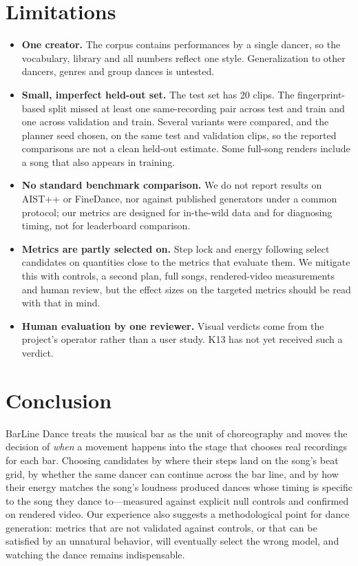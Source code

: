 \documentclass[10pt]{article}
\begin{document}
\section{Limitations}
\label{sec:limitations}

\begin{itemize}
  \item \textbf{One creator.} The corpus contains performances by a single dancer, so the vocabulary, library and all numbers reflect one style. Generalization to other dancers, genres and group dances is untested.
  \item \textbf{Small, imperfect held-out set.} The test set has 20 clips. The fingerprint-based split missed at least one same-recording pair across test and train and one across validation and train. Several variants were compared, and the planner seed chosen, on the same test and validation clips, so the reported comparisons are not a clean held-out estimate. Some full-song renders include a song that also appears in training.
  \item \textbf{No standard benchmark comparison.} We do not report results on AIST++ or FineDance, nor against published generators under a common protocol; our metrics are designed for in-the-wild data and for diagnosing timing, not for leaderboard comparison.
  \item \textbf{Metrics are partly selected on.} Step lock and energy following select candidates on quantities close to the metrics that evaluate them. We mitigate this with controls, a second plan, full songs, rendered-video measurements and human review, but the effect sizes on the targeted metrics should be read with that in mind.
  \item \textbf{Human evaluation by one reviewer.} Visual verdicts come from the project's operator rather than a user study. K13 has not yet received such a verdict.
\end{itemize}

\section{Conclusion}

BarLine Dance treats the musical bar as the unit of choreography and moves the decision of \emph{when} a movement happens into the stage that chooses real recordings for each bar.
Choosing candidates by where their steps land on the song's beat grid, by whether the same dancer can continue across the bar line, and by how their energy matches the song's loudness produced dances whose timing is specific to the song they dance to---measured against explicit null controls and confirmed on rendered video.
Our experience also suggests a methodological point for dance generation: metrics that are not validated against controls, or that can be satisfied by an unnatural behavior, will eventually select the wrong model, and watching the dance remains indispensable.
\end{document}
